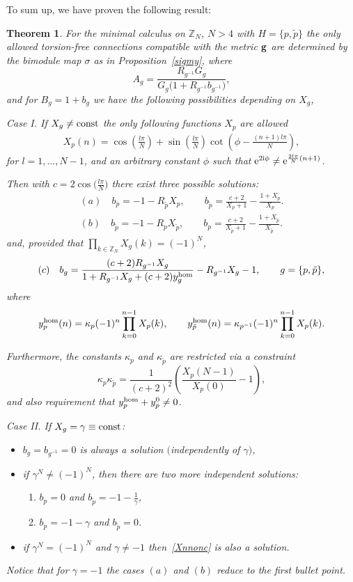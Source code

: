 \documentclass[10pt,a4paper]{amsart}
\numberwithin{equation}{section}
\newtheorem{Theorem}{Theorem}[section]
\newcommand{\ip}{{\tilde{p}}}
\begin{document}
To sum up, we have proven the following result:

\begin{Theorem}\label{theor_ZN}
For the minimal calculus on $\mathbb{Z}_N$, $N>4$ with $H=\{p,\ip\}$ the only allowed torsion-free connections compatible with the metric ${\bf g}$ are
determined by the bimodule map $\sigma$ as in Proposition~{\rm \ref{sigmy}}, where
\[
A_g=\frac{R_{g^{-1}}G_g}{G_g\big(1+R_{g^{-1}}b_{g^{-1}}\big)},
\]
and for $B_g=1+b_g$ we have the following possibilities depending on $X_g$,

{Case I.}
If $X_g\neq {\rm const}$ the only following functions $X_p$ are allowed
\begin{gather}
X_p(n)=\cos\left(\frac{l\pi }{N}\right)+\sin\left(\frac{l\pi}{N}\right)\cot\left(\phi-\frac{(n+1)l\pi}{N}\right),
\label{Xnnonc}
\end{gather}
for $l=1,\dots ,N-1$, and an arbitrary constant $\phi$ such that ${\rm e}^{2{\rm i}\phi}\neq {\rm e}^{\frac{2l\pi}{N}(n+1)}$.

Then with $c=2\cos\big(\frac{l\pi}{N}\big)$ there exist three possible solutions:
\begin{gather*}
(a) \quad b_p=-1-R_{\ip}X_p,\qquad
b_{\ip}=\frac{c+2}{X_p+1}-\frac{1+X_p}{X_p}.
\\ (b) \quad b_{\ip}=-1-R_{p}X_{\ip},\qquad
b_{p}=\frac{c+2}{X_{\ip}+1}-\frac{1+X_{\ip}}{X_{\ip}}.
\end{gather*}
and, provided that $\prod\limits_{k\in\mathbb{Z}_N}X_g(k)=(-1)^N$,
\begin{equation*}
(c) \quad b_g=\frac{(c+2)R_{g^{-1}}X_g}{1+R_{g^{-1}}X_g +(c+2)y_g^{{\rm hom}}}-R_{g^{-1}}X_g-1, \qquad g = \{p,\ip\},
\end{equation*}
where
\[
y_p^{{\rm hom}}(n) = \kappa_p (-1)^n \prod_{k=0}^{n-1} X_p(k),\qquad
y_{\ip}^{{\rm hom}}(n) = \kappa_{p^{-1}} (-1)^n \prod_{k=0}^{n-1} X_p(k).
\]

Furthermore, the constants $\kappa_p$ and $\kappa_{\ip}$ are restricted via a constraint
\[
\kappa_p\kappa_{\ip}=\frac{1}{(c+2)^2}\left(\frac{X_p(N-1)}{X_p(0)}-1\right),
\]
and also requirement that $y_p^{{\rm hom}}+y_p^0\neq 0$.

{Case II.}
If $X_g = \gamma \equiv{\rm const}$:
\begin{itemize}\itemsep=0pt
\item $b_g=b_{g^{-1}}=0$ is always a solution $($independently of $\gamma)$,
\item if $\gamma^N \neq (-1)^N$, then there are two more independent solutions:
\begin{enumerate}\itemsep=0pt
\item[$(a)$] $b_p=0$ and $b_{\ip}=-1-\frac{1}{\gamma}$,
\item[$(b)$] $b_p=-1-\gamma$ and $b_{\ip}=0$.
\end{enumerate}
\item if $\gamma^N=(-1)^N$ and $\gamma\neq -1$ then~\eqref{Xnnonc} is also a solution.
\end{itemize}
Notice that for $\gamma=-1$ the cases $(a)$ and $(b)$ reduce to the first bullet point.
\end{Theorem}
\end{document}
